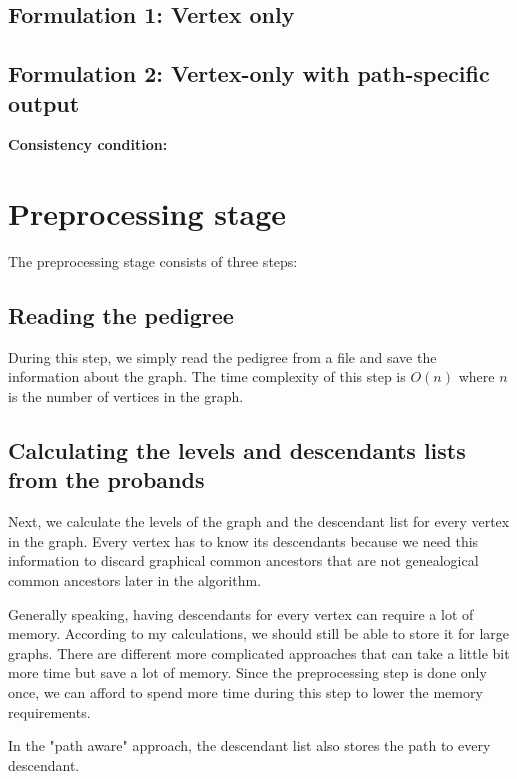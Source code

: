 \documentclass[14pt]{extarticle}
\begin{document}
 

\subsection{Formulation 1: Vertex only} 

\subsection{Formulation 2: Vertex-only with path-specific output}

\textbf{Consistency condition:} 

\section{Preprocessing stage}

The preprocessing stage consists of three steps:

\subsection{Reading the pedigree}

During this step, we simply read the pedigree from a file and save the information about the graph. The time complexity of this step is $O(n)$ where $n$ is the number of vertices in the graph.

\subsection{Calculating the levels and descendants lists from the probands}

Next, we calculate the levels of the graph and the descendant list for every vertex in the graph. Every vertex has to know its descendants because we need this information to discard graphical common ancestors that are not genealogical common ancestors later in the algorithm.

Generally speaking, having descendants for every vertex can require a lot of memory. According to my calculations, we should still be able to store it for large graphs. There are different more complicated approaches that can take a little bit more time but save a lot of memory. Since the preprocessing step is done only once, we can afford to spend more time during this step to lower the memory requirements.

In the "path aware" approach, the descendant list also stores the path to every descendant.
\end{document}
